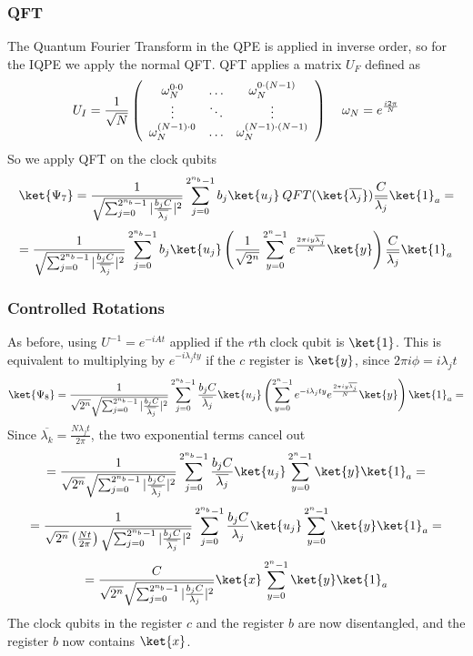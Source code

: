 \documentclass[10pt]{article}
\begin{document}
\subsubsection{QFT}
The Quantum Fourier Transform in the QPE is applied in inverse order, so for the IQPE we apply the normal QFT. QFT applies a matrix $U_F$ defined as
$$U_I=\frac{1}{\sqrt{N}}\left(
	\begin{array}{c c c}
		\omega_N^{0\cdot 0}&\ldots&\omega_N^{0\cdot (N-1)}\\
		\vdots&\ddots&\vdots\\
		\omega_N^{(N-1)\cdot 0}&\ldots&\omega_N^{(N-1)\cdot(N-1)}
	\end{array}
\right)\:\:\:\:\:\omega_N=e^{\frac{i2\pi}{N}}$$
So we apply QFT on the clock qubits
$$\ket{\Psi_7}=\frac{1}{ \sqrt{\sum_{j=0}^{2^{n_b}-1}|\frac{b_jC}{\overline{\lambda_j}}|^2}}\sum_{j=0}^{2^{n_b}-1}b_j\ket{u_j}\:QFT(\ket{\overline{\lambda_j}})\frac{C}{\overline{\lambda_j}}\ket{1}_a=$$
$$=\frac{1}{ \sqrt{\sum_{j=0}^{2^{n_b}-1}|\frac{b_jC}{\overline{\lambda_j}}|^2}}\sum_{j=0}^{2^{n_b}-1}b_j\ket{u_j}\left(\frac{1}{\sqrt{2^n}}\sum_{y=0}^{2^n-1}e^{\frac{2\pi iy\overline{\lambda_j}}{N}}\ket{y}\right)\frac{C}{\overline{\lambda_j}}\ket{1}_a$$
\subsubsection{Controlled Rotations}
As before, using $U^{-1}=e^{-iAt}$ applied if the $r$th clock qubit is $\ket{1}$. This is equivalent to multiplying by $e^{-i\lambda_jty}$ if the $c$ register is $\ket{y}$, since $2\pi i\phi=i\lambda_j t$
$$\ket{\Psi_8}=\frac{1}{\sqrt{2^n}\sqrt{\sum_{j=0}^{2^{n_b}-1}|\frac{b_jC}{\overline{\lambda_j}}|^2}}\sum_{j=0}^{2^{n_b}-1}\frac{b_jC}{\overline{\lambda_j}}\ket{u_j}\left(\sum_{y=0}^{2^n-1}e^{-i\lambda_jty}e^{\frac{2\pi iy\overline{\lambda_j}}{N}}\ket{y}\right)\ket{1}_a=$$
Since $\overline{\lambda_k}=\frac{N\lambda_j t}{2\pi}$, the two exponential terms cancel out
$$=\frac{1}{\sqrt{2^n} \sqrt{\sum_{j=0}^{2^{n_b}-1}|\frac{b_jC}{\overline{\lambda_j}}|^2}}\sum_{j=0}^{2^{n_b}-1}\frac{b_jC}{\overline{\lambda_j}}\ket{u_j}\sum_{y=0}^{2^n-1}\ket{y}\ket{1}_a=$$
$$=\frac{1}{\sqrt{2^n}\left(\frac{Nt}{2\pi}\right) \sqrt{\sum_{j=0}^{2^{n_b}-1}|\frac{b_jC}{\overline{\lambda_j}}|^2}}\sum_{j=0}^{2^{n_b}-1}\frac{b_jC}{\lambda_j}\ket{u_j}\sum_{y=0}^{2^n-1}\ket{y}\ket{1}_a=$$
$$=\frac{C}{\sqrt{2^n} \sqrt{\sum_{j=0}^{2^{n_b}-1}|\frac{b_jC}{\lambda_j}|^2}}\ket{x}\sum_{y=0}^{2^n-1}\ket{y}\ket{1}_a$$
The clock qubits in the register $c$ and the register $b$ are now disentangled, and the register $b$ now contains $\ket{x}$.
\end{document}
